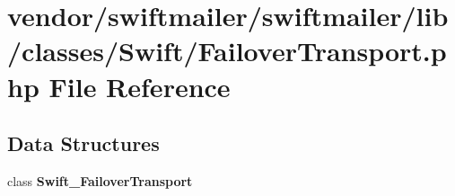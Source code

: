 \section{vendor/swiftmailer/swiftmailer/lib/classes/\+Swift/\+Failover\+Transport.php File Reference}
\label{_failover_transport_8php}
\subsection*{Data Structures}
\begin{DoxyCompactItemize}
\item 
class {\bf Swift\+\_\+\+Failover\+Transport}
\end{DoxyCompactItemize}
